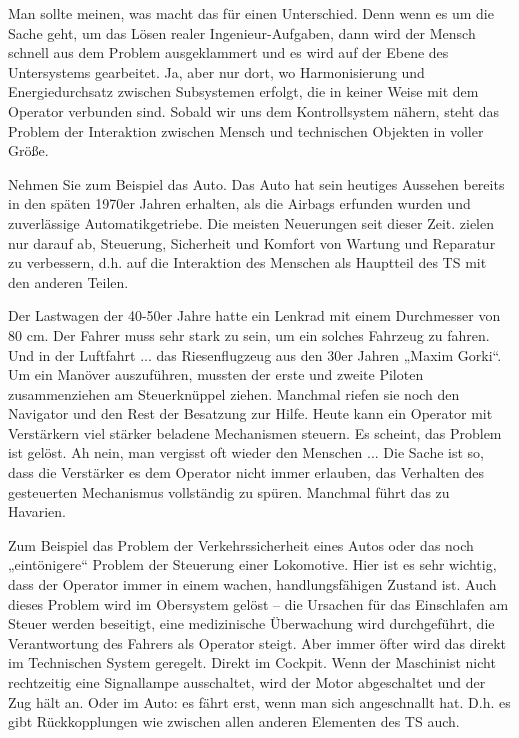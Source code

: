 \documentclass[11pt,a4paper]{article}
\begin{document}
Man sollte meinen, was macht das für einen Unterschied. Denn wenn es um die
Sache geht, um das Lösen realer Ingenieur-Aufgaben, dann wird der Mensch
schnell aus dem Problem ausgeklammert und es wird auf der Ebene des
Untersystems gearbeitet. Ja, aber nur dort, wo Harmonisierung und
Energiedurchsatz zwischen Subsystemen erfolgt, die in keiner Weise mit dem
Operator verbunden sind. Sobald wir uns dem Kontrollsystem nähern, steht das
Problem der Interaktion zwischen Mensch und technischen Objekten in voller
Größe.

Nehmen Sie zum Beispiel das Auto. Das Auto hat sein heutiges Aussehen bereits
in den späten 1970er Jahren erhalten, als die Airbags erfunden wurden und
zuverlässige Automatikgetriebe. Die meisten Neuerungen seit dieser Zeit.
zielen nur darauf ab, Steuerung, Sicherheit und Komfort von Wartung und
Reparatur zu verbessern, d.h. auf die Interaktion des Menschen als Hauptteil
des TS mit den anderen Teilen.

Der Lastwagen der 40-50er Jahre hatte ein Lenkrad mit einem Durchmesser von 80
cm.  Der Fahrer muss sehr stark zu sein, um ein solches Fahrzeug zu fahren.
Und in der Luftfahrt ...  das Riesenflugzeug aus den 30er Jahren „Maxim
Gorki“.  Um ein Manöver auszuführen, mussten der erste und zweite Piloten
zusammenziehen am Steuerknüppel ziehen. Manchmal riefen sie noch den Navigator
und den Rest der Besatzung zur Hilfe. Heute kann ein Operator mit Verstärkern
viel stärker beladene Mechanismen steuern. Es scheint, das Problem ist gelöst.
Ah nein, man vergisst oft wieder den Menschen ... Die Sache ist so, dass die
Verstärker es dem Operator nicht immer erlauben, das Verhalten des gesteuerten
Mechanismus vollständig zu spüren.  Manchmal führt das zu Havarien.

Zum Beispiel das Problem der Verkehrssicherheit eines Autos oder das noch
„eintönigere“ Problem der Steuerung einer Lokomotive. Hier ist es sehr
wichtig, dass der Operator immer in einem wachen, handlungsfähigen Zustand
ist.  Auch dieses Problem wird im Obersystem gelöst -- die Ursachen für das
Einschlafen am Steuer werden beseitigt, eine medizinische Überwachung wird
durchgeführt, die Verantwortung des Fahrers als Operator steigt. Aber immer
öfter wird das direkt im Technischen System geregelt. Direkt im Cockpit. Wenn
der Maschinist nicht rechtzeitig eine Signallampe ausschaltet, wird der Motor
abgeschaltet und der Zug hält an.  Oder im Auto: es fährt erst, wenn man sich
angeschnallt hat.  D.h. es gibt Rückkopplungen wie zwischen allen anderen
Elementen des TS auch.
\end{document}
